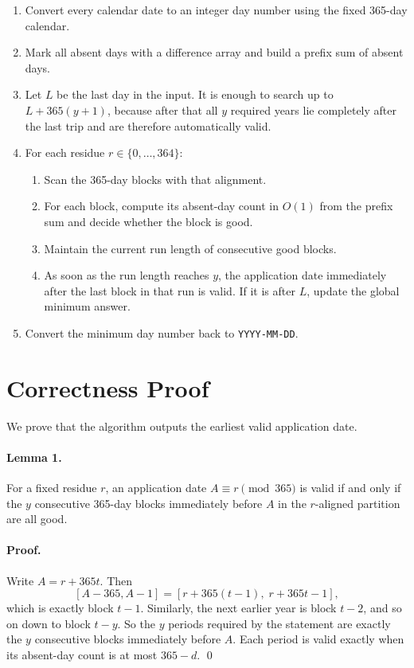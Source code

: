 \documentclass[11pt]{article}
\begin{document}
\begin{enumerate}[leftmargin=*]
    \item Convert every calendar date to an integer day number using the fixed 365-day calendar.
    \item Mark all absent days with a difference array and build a prefix sum of absent days.
    \item Let $L$ be the last day in the input. It is enough to search up to
    $L + 365(y+1)$, because after that all $y$ required years lie completely after the last trip and are
    therefore automatically valid.
    \item For each residue $r \in \{0,\dots,364\}$:
    \begin{enumerate}[leftmargin=*]
        \item Scan the 365-day blocks with that alignment.
        \item For each block, compute its absent-day count in $O(1)$ from the prefix sum and decide
        whether the block is good.
        \item Maintain the current run length of consecutive good blocks.
        \item As soon as the run length reaches $y$, the application date immediately after the last block in
        that run is valid. If it is after $L$, update the global minimum answer.
    \end{enumerate}
    \item Convert the minimum day number back to \texttt{YYYY-MM-DD}.
\end{enumerate}

\section*{Correctness Proof}

We prove that the algorithm outputs the earliest valid application date.

\paragraph{Lemma 1.}
For a fixed residue $r$, an application date $A \equiv r \pmod{365}$ is valid if and only if the $y$
consecutive 365-day blocks immediately before $A$ in the $r$-aligned partition are all good.

\paragraph{Proof.}
Write $A = r + 365t$. Then
\[
[A-365, A-1] = [r + 365(t-1),\; r + 365t - 1],
\]
which is exactly block $t-1$. Similarly, the next earlier year is block $t-2$, and so on down to block
$t-y$. So the $y$ periods required by the statement are exactly the $y$ consecutive blocks immediately
before $A$. Each period is valid exactly when its absent-day count is at most $365-d$. \qed
\end{document}
